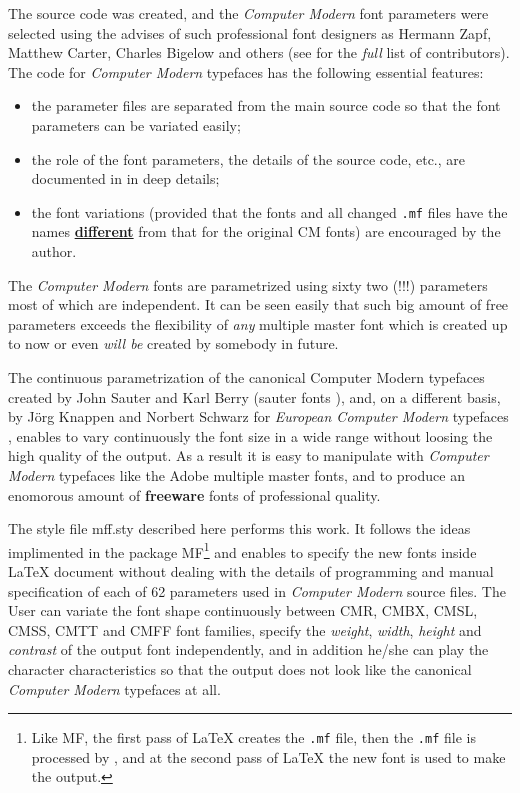 The \MF{} source code was created, and the {\sl Computer Modern}
font parameters were selected using the advises of such
professional font designers as Hermann Zapf,
Matthew Carter, Charles Bigelow and others
(see \cite{CM} for the {\em full} list of contributors).
The \MF{} code for {\sl Computer Modern} typefaces
has the following essential features:
\begin{itemize}
\item
the parameter files are separated from the main source code
so that the font parameters can be variated easily;
\item
the role of the font parameters, the details of the \MF{} source code,
etc., are documented in \cite{CM} in deep details;
\item
the font variations (provided that the fonts and all
changed {\tt .mf} files have the names \underline{\bf different}
from that for the original CM fonts)
are encouraged by the author.
\end{itemize}
The {\sl Computer Modern} fonts are parametrized using
sixty two \hbox{(!!!)} parameters most of which are independent.
It can be seen easily that such big amount of free parameters
exceeds the flexibility of {\em any} multiple master font
which is created up to now or even {\em will be} created
by somebody in future.

The continuous parametrization of the canonical Computer Modern
typefaces created by John Sauter and Karl Berry
({\sc sauter} fonts \cite{SAUTER}), and, on a different basis,
by J\"org Knappen and Norbert Schwarz for
{\sl European Computer Modern} typefaces \cite{DC},
enables to vary continuously the font size in a wide range
without loosing the high quality of the output.
As a result it is easy to manipulate with
{\sl Computer Modern} typefaces like the Adobe multiple master fonts,
and to produce an enomorous amount of {\bf freeware}
fonts of professional quality.

The style file {\sc mff.sty} described here performs this work.
It follows the ideas implimented in the package MF\PiC{}\footnote{%
Like MF\PiC, the first pass of \LaTeX{}
creates the {\tt .mf} file,
then the {\tt .mf} file is processed by \MF,
and at the second pass of \LaTeX{} the new
font is used to make the output.}
and enables to specify the new fonts inside \LaTeX{} document
without dealing with the details of \MF{} programming and
manual specification of each of 62 parameters used in
{\sl Computer Modern} source files.
The User can variate the font shape continuously between
CMR, CMBX, CMSL, CMSS, CMTT and CMFF font families,
specify the {\em weight}, {\em width}, {\em height}
and {\em contrast} of the output font independently,
and in addition he/she can play the character
characteristics so that the output does not
look like the canonical {\sl Computer Modern}
typefaces at all.

